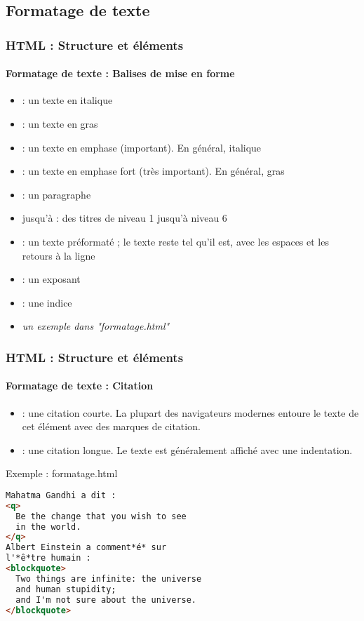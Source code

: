 \documentclass[xcolor=table]{beamer}
\begin{document}
\subsection{Formatage de texte}

\begin{frame}
\frametitle{HTML : Structure et éléments}
\framesubtitle{Formatage de texte : Balises de mise en forme}

\begin{itemize}
	\item {} : un texte en italique
	\item {} : un texte en gras
	\item {} : un texte en emphase (important). En général, italique
	\item {} : un texte en emphase fort (très important). En général, gras
	\item {} : un paragraphe
	\item {} jusqu'à  : des titres de niveau 1 jusqu'à niveau 6
	\item {} : un texte préformaté ; le texte reste tel qu'il est, avec les espaces et les retours à la ligne
	\item {} : un exposant
	\item {} : une indice
	\item \textit{un exemple dans "formatage.html"}
\end{itemize}

\end{frame}

\begin{frame}[fragile]
\frametitle{HTML : Structure et éléments}
\framesubtitle{Formatage de texte : Citation}

\begin{minipage}{0.44\textwidth} 
	\begin{itemize}
		\item {} : une citation courte. 
		La plupart des navigateurs modernes entoure le texte de cet élément avec des marques de citation.
		\item {} : une citation longue. 
		Le texte est généralement affiché avec une indentation.
	\end{itemize}
\end{minipage}
%
\begin{minipage}{0.55\textwidth}
\begin{exampleblock}{Exemple : formatage.html}
\lstset{escapeinside=**}
\scriptsize\bfseries
\begin{lstlisting}[language={html}]
Mahatma Gandhi a dit :
<q>
  Be the change that you wish to see 
  in the world.
</q>
Albert Einstein a comment*é* sur 
l'*ê*tre humain :
<blockquote>
  Two things are infinite: the universe 
  and human stupidity; 
  and I'm not sure about the universe.
</blockquote>
\end{lstlisting}
\end{exampleblock}
\end{minipage}

\end{frame}
\end{document}
